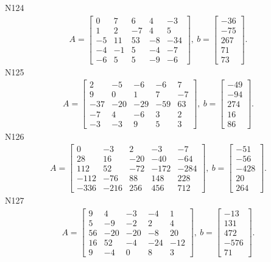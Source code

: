 \documentclass[11pt]{report}
\begin{document}
N124
\begin{align*}
 A = \left[\begin{matrix}0 & 7 & 6 & 4 & -3\\1 & 2 & -7 & 4 & 5\\-5 & 11 & 53 & -8 & -34\\-4 & -1 & 5 & -4 & -7\\-6 & 5 & 5 & -9 & -6\end{matrix}\right],
\ b = \left[\begin{matrix}-36\\-75\\267\\71\\73\end{matrix}\right]. 
 \end{align*}
N125
\begin{align*}
 A = \left[\begin{matrix}2 & -5 & -6 & -6 & 7\\9 & 0 & 1 & 7 & -7\\-37 & -20 & -29 & -59 & 63\\-7 & 4 & -6 & 3 & 2\\-3 & -3 & 9 & 5 & 3\end{matrix}\right],
\ b = \left[\begin{matrix}-49\\-94\\274\\16\\86\end{matrix}\right]. 
 \end{align*}
N126
\begin{align*}
 A = \left[\begin{matrix}0 & -3 & 2 & -3 & -7\\28 & 16 & -20 & -40 & -64\\112 & 52 & -72 & -172 & -284\\-112 & -76 & 88 & 148 & 228\\-336 & -216 & 256 & 456 & 712\end{matrix}\right],
\ b = \left[\begin{matrix}-51\\-56\\-428\\20\\264\end{matrix}\right]. 
 \end{align*}
N127
\begin{align*}
 A = \left[\begin{matrix}9 & 4 & -3 & -4 & 1\\5 & -9 & -2 & 2 & 4\\56 & -20 & -20 & -8 & 20\\16 & 52 & -4 & -24 & -12\\9 & -4 & 0 & 8 & 3\end{matrix}\right],
\ b = \left[\begin{matrix}-13\\131\\472\\-576\\71\end{matrix}\right]. 
 \end{align*}
\end{document}
